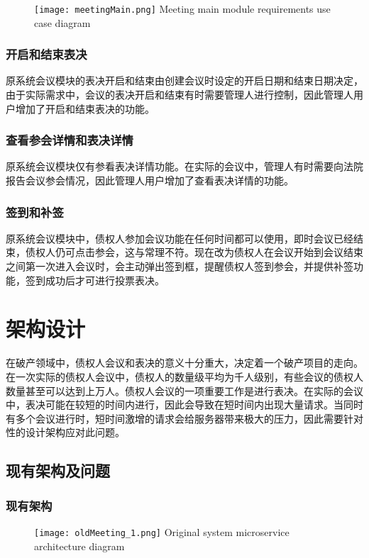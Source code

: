 \begin{figure}[!htp]
  \centering
  \texttt{[image: meetingMain.png]}
    {Meeting main module requirements use case diagram}
 \label{fig:meetingMain}
\end{figure}

\subsubsection{开启和结束表决}
原系统会议模块的表决开启和结束由创建会议时设定的开启日期和结束日期决定，由于实际需求中，会议的表决开启和结束有时需要管理人进行控制，因此管理人用户增加了开启和结束表决的功能。

\subsubsection{查看参会详情和表决详情}
原系统会议模块仅有参看表决详情功能。在实际的会议中，管理人有时需要向法院报告会议参会情况，因此管理人用户增加了查看表决详情的功能。

\subsubsection{签到和补签}
原系统会议模块中，债权人参加会议功能在任何时间都可以使用，即时会议已经结束，债权人仍可点击参会，这与常理不符。现在改为债权人在会议开始到会议结束之间第一次进入会议时，会主动弹出签到框，提醒债权人签到参会，并提供补签功能，签到成功后才可进行投票表决。

\section{架构设计}
在破产领域中，债权人会议和表决的意义十分重大，决定着一个破产项目的走向。在一次实际的债权人会议中，债权人的数量级平均为千人级别，有些会议的债权人数量甚至可以达到上万人。债权人会议的一项重要工作是进行表决。在实际的会议中，表决可能在较短的时间内进行，因此会导致在短时间内出现大量请求。当同时有多个会议进行时，短时间激增的请求会给服务器带来极大的压力，因此需要针对性的设计架构应对此问题。

\subsection{现有架构及问题}

\subsubsection{现有架构}
\begin{figure}[!htp]
  \centering
  \texttt{[image: oldMeeting\_1.png]}
    {Original system microservice architecture diagram\cite{Wang2021}}
 \label{fig:oldMeeting_1}
\end{figure}

